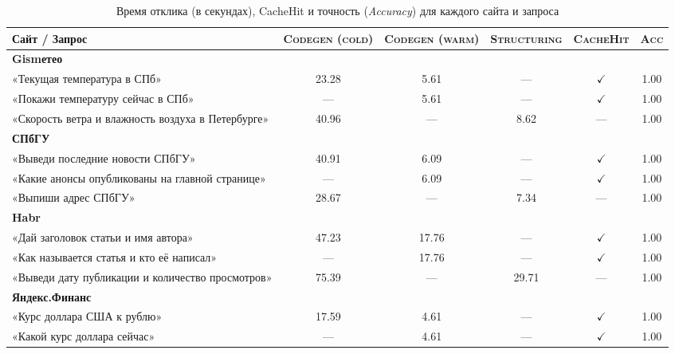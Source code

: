 \begin{sidewaystable}
    \def\arraystretch{1.1}
    \setlength\tabcolsep{0.7em}
    \centering
    \scriptsize
    \caption{Время отклика (в секундах), CacheHit и точность (\emph{Accuracy}) для каждого сайта и запроса}
    \begin{tabular}{p{5cm} c c c c c}
        \toprule
        \multicolumn{1}{l}{Сайт / Запрос} &
        \multicolumn{1}{c}{\textsc{Codegen (cold)}} &
        \multicolumn{1}{c}{\textsc{Codegen (warm)}} &
        \multicolumn{1}{c}{\textsc{Structuring}} &
        \multicolumn{1}{c}{\textsc{CacheHit}} &
        \multicolumn{1}{c}{\textsc{Acc}} \\
        \midrule
        \textbf{Gismетео} & & & & & \\
        «Текущая температура в СПб»                      & 23.28  & 5.61  & —    & $\checkmark$   & 1.00 \\
        «Покажи температуру сейчас в СПб»                & —      & 5.61  & —    & $\checkmark$   & 1.00 \\
        «Скорость ветра и влажность воздуха в Петербурге» & 40.96  & —     & 8.62 & —              & 1.00 \\
        \midrule
        \textbf{СПбГУ} & & & & & \\
        «Выведи последние новости СПбГУ»                  & 40.91  & 6.09  & —    & $\checkmark$   & 1.00 \\
        «Какие анонсы опубликованы на главной странице»    & —      & 6.09  & —    & $\checkmark$   & 1.00 \\
        «Выпиши адрес СПбГУ»                              & 28.67  & —     & 7.34 & —              & 1.00 \\
        \midrule
        \textbf{Habr} & & & & & \\
        «Дай заголовок статьи и имя автора»               & 47.23  & 17.76 & —    & $\checkmark$   & 1.00 \\
        «Как называется статья и кто её написал»           & —      & 17.76 & —    & $\checkmark$   & 1.00 \\
        «Выведи дату публикации и количество просмотров»   & 75.39  & —     & 29.71 & —             & 1.00 \\
        \midrule
        \textbf{Яндекс.Финанс} & & & & & \\
        «Курс доллара США к рублю»                        & 17.59  & 4.61  & —    & $\checkmark$              & 1.00 \\
        «Какой курс доллара сейчас»                       & —      & 4.61  & —    & $\checkmark$   & 1.00 \\

\end{tabular}
\end{sidewaystable}

